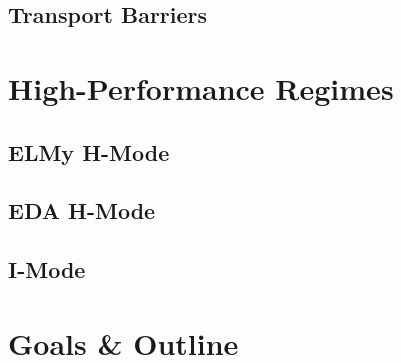 \subsection{Transport Barriers}\label{subsec:intro_barriers}


\section{High-Performance Regimes}\label{sec:intro_regimes}

\subsection{ELMy H-Mode}\label{subsec:intro_elmy}

\subsection{EDA H-Mode}\label{subsec:intro_EDA}

\subsection{I-Mode}\label{subsec:intro_imode}


\section{Goals \& Outline}\label{sec:intro_outline}




 